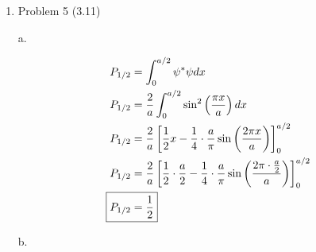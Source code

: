 \documentclass[12pt]{article}
\begin{document}
\begin{enumerate}
    \begin{align*}
        P &= \psi^*\psi dV \\
        P &= \psi^*\psi \cdot 4\pi r^2 dr \\
        P &= \frac{1}{\pi a_0^3} \int_0^{a_0} e^{-2r/a_0} \cdot 4\pi r^2 dr \\
        &= \frac{4}{a_0^3} \int_0^{a_0} e^{-2r/a_0} r^2 dr \\
        &= \frac{4}{a_0^3} \left(\frac{r^2e^{-2r/a_0}}{-2/a_0} + \frac{2a_0}{2} \int_0^{a_0} re^{-2r/a_0}dr\right) \\
        &= \frac{4}{a_0^3} \left[\frac{r^2e^{-2r/a_0}}{-2/a_0} + a_0 \left(\frac{a_0re^{-2r}}{-2} + \frac{a_0}{2} \int_0^{a_0} e^{-2r/a_0}dr\right)\right] \\
        &= \frac{4}{a_0^3} \left[\frac{r^2e^{-2r/a_0}}{-2/a_0} + a_0 \left(\frac{a_0re^{-2r/a_0}}{-2} + \frac{a_0}{2} \frac{-a_0}{2}e^{-2r/a_0}\right)_0^{a_0}\right] \\
        &= \frac{-a_0}{2}e^{-2} - \frac{a_0^3}{2}e^{-2} - \frac{a_0^3}{4}e^{-2} + 0 + 0 + \frac{a_0^3}{4} \\
        P &= \frac{4}{a_0^3} \left[a_0^3 \left(\frac{-1}{2e^2} - \frac{1}{2e^2} - \frac{1}{4e^2} + \frac{1}{4}\right)\right] \\
        \Aboxed{\text{Probability of $r\leq a_0$} &= 0.323}
    \end{align*}
    
    \newpage
    \item Problem 5 (3.11)
    
    a.

    \begin{align*}
        P_{1/2} &= \int_0^{a/2} \psi^*\psi dx \\
        P_{1/2} &= \frac{2}{a} \int_0^{a/2} \sin^2\left(\frac{\pi x}{a}\right) dx \\
        P_{1/2} &= \frac{2}{a} \left[\frac{1}{2}x - \frac{1}{4} \cdot \frac{a}{\pi} \sin\left(\frac{2\pi x}{a}\right) \right]_0^{a/2} \\
        P_{1/2} &= \frac{2}{a} \left[\frac{1}{2} \cdot \frac{a}{2} - \frac{1}{4} \cdot \frac{a}{\pi} \sin\left(\frac{2\pi \cdot \frac{a}{2}}{a}\right) \right]_0^{a/2} \\
        \Aboxed{P_{1/2} &= \frac{1}{2}}
    \end{align*}

    b.


\end{enumerate}
\end{document}
